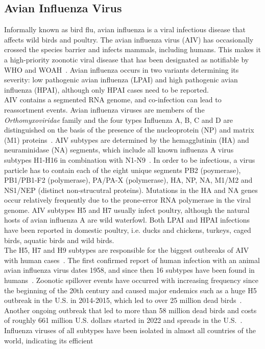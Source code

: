 \subsection{Avian Influenza Virus}
Informally known as bird flu, avian influenza is a viral infectious disease that affects wild birds and poultry. The avian influenza virus (AIV) has occasionally crossed the species barrier and infects mammals, including humans. This makes it a high-priority zoonotic viral disease that has been designated as notifiable by WHO and WOAH~\cite{woah2023list}. Avian influenza occurs in two variants determining its severity: low pathogenic avian influenza (LPAI) and high pathogenic avian influenza (HPAI), although only HPAI cases need to be reported. \\
AIV contains a segmented RNA genome, and co-infection can lead to reassortment events. Avian influenza viruses are members of the \textit{Orthomyxoviridae} family and the four types Influenza A, B, C and D are distinguished on the basis of the presence of the nucleoprotein (NP) and matrix (M1) proteins~\cite{webster1992evolution}. AIV subtypes are determined by the hemagglutinin (HA) and neuraminidase (NA) segments, which include all known influenza A virus subtypes H1-H16 in combination with N1-N9~\cite{webster1992evolution}. In order to be infectious, a virus particle has to contain each of the eight unique segments PB2 (poymerase), PB1/PB1-F2 (polymerase), PA/PA-X (polymerase), HA, NP, NA, M1/M2 and NS1/NEP (distinct non-strucutral proteins). Mutations in the HA and NA genes occur relatively frequently due to the prone-error RNA polymerase in the viral genome. AIV subtypes H5 and H7 usually infect poultry, although the natural hosts of avian influenza A are wild waterfowl. Both LPAI and HPAI infections have been reported in domestic poultry, i.e. ducks and chickens, turkeys, caged birds, aquatic birds and wild birds. \\
The H5, H7 and H9 subtypes are responsible for the biggest outbreaks of AIV with human cases~\cite{widdowson2017global}. The first confirmed report of human infection with an animal avian influenza virus dates 1958, and since then 16 subtypes have been found in humans~\cite{kluska1961demonstration}. Zoonotic spillover events have occurred with increasing frequency since the beginning of the 20th century and caused major endemics such as a huge H5 outbreak in the U.S. in 2014-2015, which led to over 25 million dead birds~\cite{seeger2021poultry}. Another ongoing outbreak that led to more than 58 million dead birds and costs of roughly 661 million U.S. dollars started in 2022 and spreads in the U.S.~\cite{usda2023hpai}. \\
Influenza viruses of all subtypes have been isolated in almost all countries of the world, indicating its efficient

